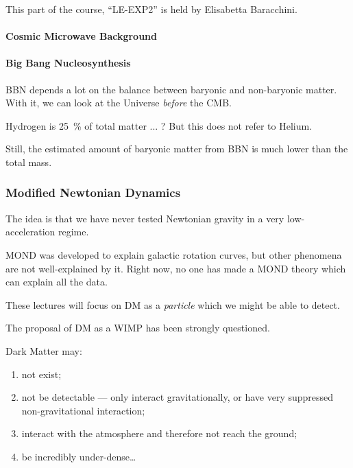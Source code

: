 \documentclass[main.tex]{subfiles}
\begin{document}

This part of the course, ``LE-EXP2'' is held by Elisabetta Baracchini. 


\paragraph{Cosmic Microwave Background}

\paragraph{Big Bang Nucleosynthesis}

BBN depends a lot on the balance between baryonic and non-baryonic matter.
With it, we can look at the Universe \emph{before} the CMB. 

Hydrogen is \SI{25}{\percent} of total matter ... ?
But this does not refer to Helium. 

Still, the estimated amount of baryonic matter from BBN is much lower 
than the total mass. 

\subsubsection{Modified Newtonian Dynamics}

The idea is that we have never tested Newtonian gravity in a very low-acceleration 
regime. 

MOND was developed to explain galactic rotation curves, but other 
phenomena are not well-explained by it. 
Right now, no one has made a MOND theory which can explain all the data. 

These lectures will focus on DM as a \emph{particle} which we might be able 
to detect. 

The proposal of DM as a WIMP has been strongly questioned. 

Dark Matter may:
\begin{enumerate}
    \item not exist;
    \item not be detectable --- only interact gravitationally, or have very suppressed non-gravitational interaction;
    \item interact with the atmosphere and therefore not reach the ground;
    \item be incredibly under-dense\dots
\end{enumerate}
\end{document}
